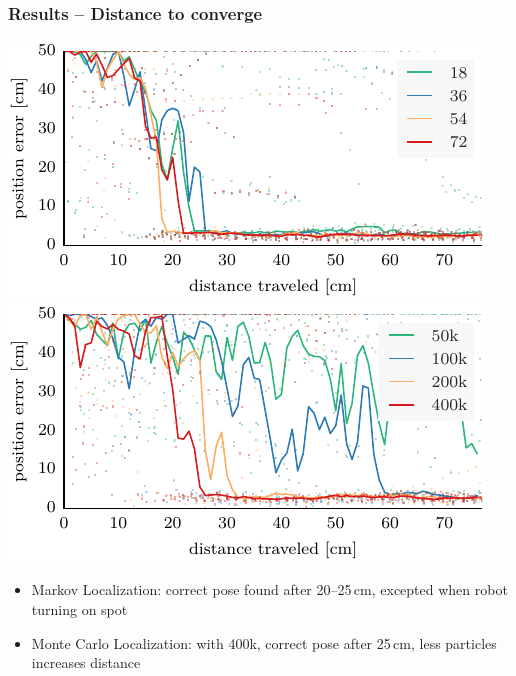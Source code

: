 \documentclass[lualatex,aspectratio=169,xcolor=dvipsnames,10pt,c]{beamer}
\begin{document}
\frame
{
	\frametitle{Results – Distance to converge}
	
	\hfill
	
	{\footnotesize
	\makebox[.5\textwidth][c]{\textcolor{gray}{varying number of discretization angles}}\hfill
	\makebox[.5\textwidth][c]{\textcolor{gray}{varying number of particles}}
	}
	
	\includegraphics[width=.48\columnwidth]{ml-small_runs_random_12-xy}\hfill
	\includegraphics[width=.48\columnwidth]{mcl-small_runs_random_12-xy}

	\vspace{1em}

	\begin{itemize}
	\item Markov Localization: correct pose found after 20--25\,cm, excepted when robot turning on spot
	\item Monte Carlo Localization: with 400k, correct pose after 25\,cm, less particles increases distance
	\end{itemize}
}
\end{document}
